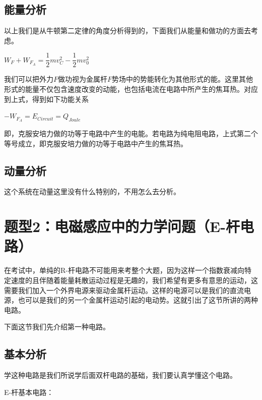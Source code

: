 \documentclass{ctexbook}
\begin{document}
	\subsection{能量分析}
	
	以上我们是从牛顿第二定律的角度分析得到的，下面我们从能量和做功的方面去考虑。
	
	\centerline{$W_F+W_{F_A}=\dfrac{1}{2}m v_C^2-\dfrac{1}{2}m v_0^2$}
	
	我们可以把外力$F$做功视为金属杆$F$势场中的势能转化为其他形式的能。这里其他形式的能量不仅包含速度改变的动能，也包括电流在电路中所产生的焦耳热。对应到上式，得到如下功能关系
	
	\centerline{$-W_{F_A}=E_{Circuit}=Q_{Joule}$}
	
	即，克服安培力做的功等于电路中产生的电能。若电路为纯电阻电路，上式第二个等号成立，即克服安培力做的功等于电路中产生的焦耳热。
	
	\subsection{动量分析}
	
	这个系统在动量这里没有什么特别的，不用怎么去分析。
	
	\section{题型2：电磁感应中的力学问题（E-杆电路）}
	在考试中，单纯的R-杆电路不可能用来考整个大题，因为这样一个指数衰减向特定速度的且伴随着能量耗散运动过程是无趣的，我们希望有更多有意思的运动，这需要我们加入一个外界电源来驱动金属杆运动。这样的电源可以是我们的直流电源，也可以是我们的另一个金属杆运动引起的电动势。这就引出了这节所讲的两种电路。
	
	下面这节我们先介绍第一种电路。
	
	\subsection{基本分析}
	
	学这种电路是我们所说学后面双杆电路的基础，我们要认真学懂这个电路。
	
	E-杆基本电路：
	
	\hspace*{\fill}
	
	\hspace*{\fill}
	
	\hspace*{\fill}
	
	\hspace*{\fill}
	
\end{document}
